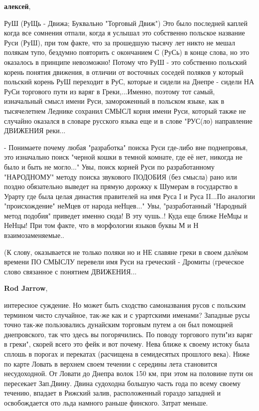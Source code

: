 \begin{itemize}
\begin{itemize}
\textbf{алексей}, 

РуШ (РуЩь - Движа; Буквально "Торговый Движ") Это было последней каплей когда
все сомнения отпали, когда я услышал это собственно польское название Руси
(РуШ), при том факте, что за прошедшую тысячу лет никто не мешал полякам тупо,
бездумно повторить с окончанием С (РуСь) в конце слова, но это оказалось в
принципе невозможно! Потому что РуШ - это собственно польский корень понятия
движения, в отличии от восточных соседей поляков у который польский корень РуШ
переходит в РуС, которые и сидели на Днепре - сидели НА РуСи торгового пути из
варяг в Греки,...Именно, поэтому тот самый, изначальный смысл имени Руси,
замороженный в польском языке, как в тысячелетнем Леднике сохранил СМЫСЛ корня
имени Руси, который также не случайно оказался в словаре русского языка еще и в
слове "РУС(ло) направление ДВИЖЕНИЯ реки...

- Понимаете почему любая "разработка" поиска Руси где-либо вне поднепровья, это
изначально поиск "черной кошки в темной комнате, где её нет, никогда не было и
быть не могло..." Увы, поиск корней Руси по разработанному "НАРОДНОМУ" методу
поиска звукового ПОДОБИЯ (без смысла) рано или поздно обязательно выведет на
прямую дорожку к Шумерам в государство в Урарту где была целая династия
правителей на имя Руса I и Руса II...По аналогии "происхождение" неМцев от
народа неНцев..." Увы, "разработанный "Народный метод подобия" приведет именно
сюда! В эту чушь..! Куда еще ближе НеМцы и НеНцы! При том факте, что в
морфологии языков буквы М и Н взаимозаменяемые..

(К слову, оказывается не только поляки но и НЕ славяне греки в своем далёком
времени ПО СМЫСЛУ перевели имя Руси на греческий - Дромиты (греческое слово
связанное с понятием ДВИЖЕНИЯ...

\textbf{Rod Jarrow}, 

интересное суждение. Но может быть сходство самоназвания русов с польским
термином чисто случайное, так-же как и с урартскими именами? Западные русы
точно так-же пользовались дунайским торговым путем а он был помощней
днепровского, так что здесь вы погорячились. По поводу торгового пути"из варяг
в греки", скорей всего это фейк и вот почему. Нева ближе к своему истоку была
сплошь в порогах и перекатах (расчищена в семидесятых прошлого века). Ниже по
карте Ловать в верхнем своем течении с середины лета становится несудоходной.
От Ловати до Днепра волок 150 км, при этом на половине пути он пересекает
Зап.Двину. Двина судоходна большую часть года по всему своему течению, впадает
в Рижский залив, расположенный гораздо западней и освобождается ото льда
намного раньше финского. Затрат меньше.


\end{itemize}
\end{itemize}
